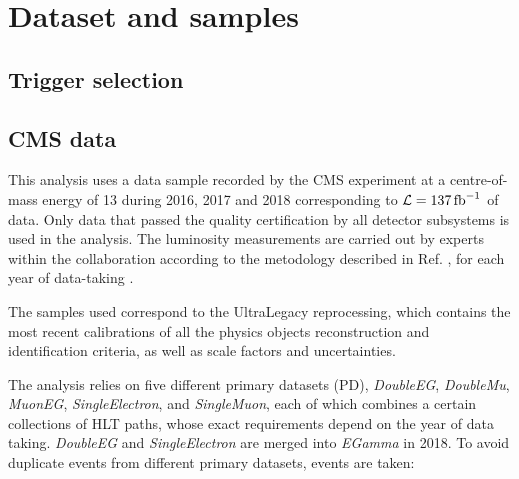 \section{Dataset and samples}
\label{sec:datasets}

\subsection{Trigger selection}


\subsection{CMS data}
This analysis uses a data sample recorded by the CMS experiment at a centre-of-mass energy of 13 \TeV during 2016, 2017 and 2018 corresponding to $\mathcal{L} = 137 \mbox{\ensuremath{\,\text{fb}^{-1}}}$ of data.
Only data that passed the quality certification by all detector subsystems is used in the analysis.
The luminosity measurements are carried out by experts within the collaboration according to the metodology described in Ref. \cite{CMS:LUM-17-003}, for each year of data-taking \cite{CMS:LUM-17-004, CMS:LUM-18-002}.

The samples used correspond to the UltraLegacy reprocessing, which contains the most recent calibrations of all the physics objects reconstruction and identification criteria, as well as scale factors and uncertainties.

The analysis relies on five different primary datasets (PD),
{\it DoubleEG}, {\it DoubleMu}, {\it MuonEG}, {\it SingleElectron}, and {\it SingleMuon},
each of which combines a certain collections of HLT paths, whose exact requirements depend on the year of data
taking. {\it DoubleEG} and {\it SingleElectron} are merged into {\it EGamma} in 2018.
To avoid duplicate events from different primary datasets, events are taken:

